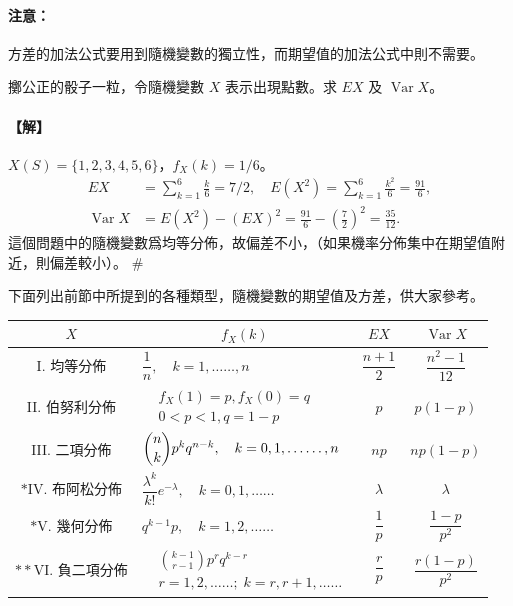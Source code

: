 \medskip
\paragraph{注意：}
方差的加法公式要用到隨機變數的獨立性，而期望值的加法公式中則不需要。

\medskip
\begin{example}\label{ex:b5s-5-14}
擲公正的骰子一粒，令隨機變數 $X$ 表示出現點數。求 $EX$ 及 $\operatorname{Var} X$。
\end{example}
\paragraph{【解】}
$X(S)=\{1, 2, 3, 4, 5, 6\}$，$f_X(k)=1/6$。
\begin{align*}
EX &= \sum_{k=1}^6 \frac{k}{6} = 7/2, \quad E(X^2) = \sum_{k=1}^6 \frac{k^2}{6} = \frac{91}{6}, \\
\operatorname{Var} X &= E(X^2) - (EX)^2 = \frac{91}{6} - \left(\frac{7}{2}\right)^2 = \frac{35}{12}.
\end{align*}
這個問題中的隨機變數爲均等分佈，故偏差不小，（如果機率分佈集中在期望值附近，則偏差較小）。 \hfill \#

\medskip
下面列出前節中所提到的各種類型，隨機變數的期望值及方差，供大家參考。

\begin{center}
\renewcommand{\arraystretch}{1.5}
\begin{tabular}{|c|l|c|c|}
\hline
$X$ & \multicolumn{1}{c|}{$f_X(k)$} & $EX$ & $\operatorname{Var} X$ \\
\hline
I. 均等分佈 & $\dfrac{1}{n}, \quad k = 1, \ldots\ldots, n$ & $\dfrac{n+1}{2}$ & $\dfrac{n^2-1}{12}$ \\
\hline
II. 伯努利分佈 & $\begin{aligned}&f_X(1)=p, f_X(0)=q \\ &0 < p < 1, q = 1-p\end{aligned}$ & $p$ & $p(1-p)$ \\
\hline
III. 二項分佈 & $\dbinom{n}{k} p^k q^{n-k}, \quad k = 0, 1, \ldots\ldots, n$ & $np$ & $np(1-p)$ \\
\hline
$*$IV. 布阿松分佈 & $\dfrac{\lambda^k}{k!} e^{-\lambda}, \quad k = 0, 1, \ldots\ldots$ & $\lambda$ & $\lambda$ \\
\hline
$*$V. 幾何分佈 & $q^{k-1}p, \quad k = 1, 2, \ldots\ldots$ & $\dfrac{1}{p}$ & $\dfrac{1-p}{p^2}$ \\
\hline
$**$VI. 負二項分佈 & $\begin{aligned}&\binom{k-1}{r-1} p^r q^{k-r} \\ &r=1, 2, \ldots\ldots; \; k=r, r+1, \ldots\ldots\end{aligned}$ & $\dfrac{r}{p}$ & $\dfrac{r(1-p)}{p^2}$ \\
\hline
\end{tabular}
\end{center}

